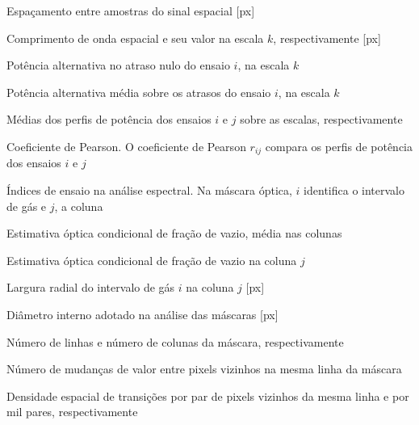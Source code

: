 \begin{simbolos}
  \item[$\Delta s$] Espaçamento entre amostras do sinal espacial [px]
  \item[$\lambda$, $\lambda_k$] Comprimento de onda espacial e seu valor
  na escala $k$, respectivamente [px]
  \item[$P_{ik}$] Potência alternativa no atraso nulo do ensaio $i$, na escala $k$
  \item[$M_{ik}$] Potência alternativa média sobre os atrasos do ensaio $i$, na escala $k$
  \item[$\bar P_i$, $\bar P_j$] Médias dos perfis de potência dos ensaios $i$ e $j$
  sobre as escalas, respectivamente
  \item[$r$, $r_{ij}$] Coeficiente de Pearson. O coeficiente de Pearson $r_{ij}$ compara os perfis de
  potência dos ensaios $i$ e $j$
  \item[$i$, $j$] Índices de ensaio na análise espectral. Na máscara óptica,
  $i$ identifica o intervalo de gás e $j$, a coluna
  \item[$\widehat\alpha_{\mathrm{opt}}$] Estimativa óptica condicional de fração de vazio, média nas colunas
  \item[$\widehat\alpha_{\mathrm{opt},j}$] Estimativa óptica condicional de fração de vazio
  na coluna $j$
  \item[$d_{ij}$] Largura radial do intervalo de gás $i$ na coluna $j$ [px]
  \item[$D_{\mathrm{px}}$] Diâmetro interno adotado na análise das máscaras [px]
  \item[$H$, $W$] Número de linhas e número de colunas da máscara, respectivamente
  \item[$N_{\mathrm{trans}}$] Número de mudanças de valor entre pixels vizinhos na mesma linha da máscara
  \item[$F$, $1\,000F$] Densidade espacial de transições por par de pixels
  vizinhos da mesma linha e por mil pares, respectivamente
\end{simbolos}

\tableofcontents*
\cleardoublepage
